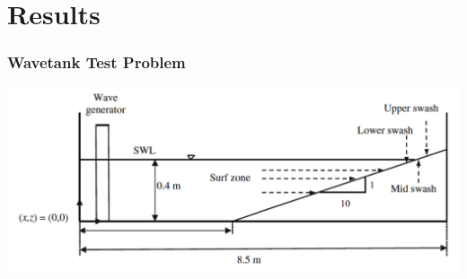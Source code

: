 \documentclass{beamer}
\begin{document}

 
\section{Results}

\begin{frame}
\frametitle{Wavetank Test Problem}
\includegraphics[width=\textwidth,keepaspectratio=true]{wavetank.pdf}
\end{frame}
\end{document}
